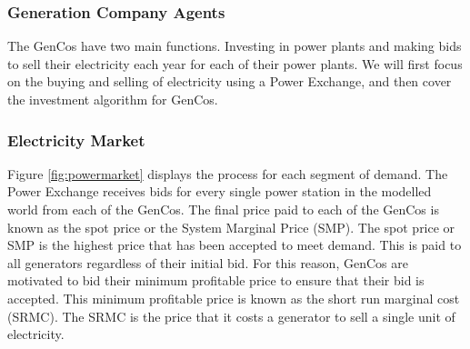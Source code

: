 \subsubsection{Generation Company Agents} The GenCos have two main functions. Investing in power plants and making bids to sell their electricity each year for each of their power plants. We will first focus on the buying and selling of electricity using a Power Exchange, and then cover the investment algorithm for GenCos.

\subsubsection{Electricity Market} \label{sssec:electricity_market} Figure \ref{fig:powermarket} displays the process for each segment of demand. The Power Exchange receives bids for every single power station in the modelled world from each of the GenCos. The final price paid to each of the GenCos is known as the spot price or the System Marginal Price (SMP). The spot price or SMP is the highest price that has been accepted to meet demand. This is paid to all generators regardless of their initial bid. For this reason, GenCos are motivated to bid their minimum profitable price to ensure that their bid is accepted. This minimum profitable price is known as the short run marginal cost (SRMC). The SRMC is the price that it costs a generator to sell a single unit of electricity. 

 

